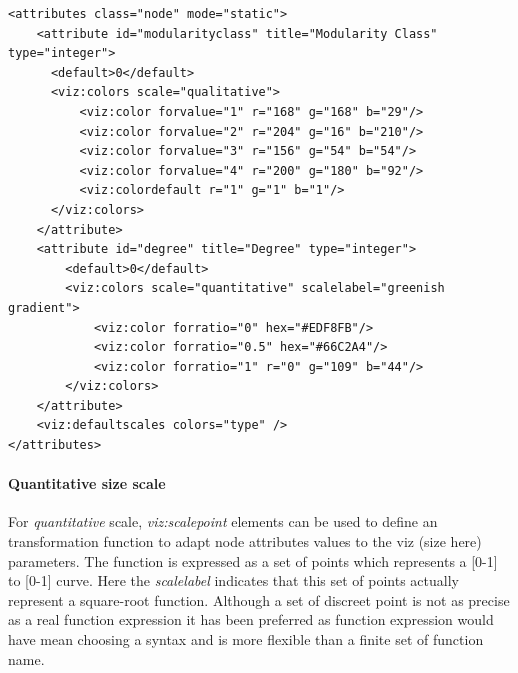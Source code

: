 \documentclass[a4paper,10pt]{article}
\begin{document}
\lstset{ style=gexf }
\begin{lstlisting}[caption={Quantitative color scale},label=vizscalecolorquanti]
  <attributes class="node" mode="static">
    <attribute id="modularityclass" title="Modularity Class" type="integer">
      <default>0</default>
      <viz:colors scale="qualitative">
          <viz:color forvalue="1" r="168" g="168" b="29"/>
          <viz:color forvalue="2" r="204" g="16" b="210"/>
          <viz:color forvalue="3" r="156" g="54" b="54"/>
          <viz:color forvalue="4" r="200" g="180" b="92"/>
          <viz:colordefault r="1" g="1" b="1"/>
      </viz:colors>
    </attribute>
    <attribute id="degree" title="Degree" type="integer">
        <default>0</default>
        <viz:colors scale="quantitative" scalelabel="greenish gradient">
            <viz:color forratio="0" hex="#EDF8FB"/>
            <viz:color forratio="0.5" hex="#66C2A4"/>
            <viz:color forratio="1" r="0" g="109" b="44"/>
        </viz:colors>
    </attribute>
    <viz:defaultscales colors="type" />
</attributes>
\end{lstlisting}

\paragraph{Quantitative size scale} For \textit{quantitative} scale, \textit{viz:scalepoint} elements can be used to define an transformation function to adapt node attributes values to the viz (size here) parameters. The function is expressed as a set of points which represents a [0-1] to [0-1] curve. Here the \textit{scalelabel} indicates that this set of points actually represent a square-root function. Although a set of discreet point is not as precise as a real function expression it has been preferred as function expression would have mean choosing a syntax and is more flexible than a finite set of function name.
\end{document}
